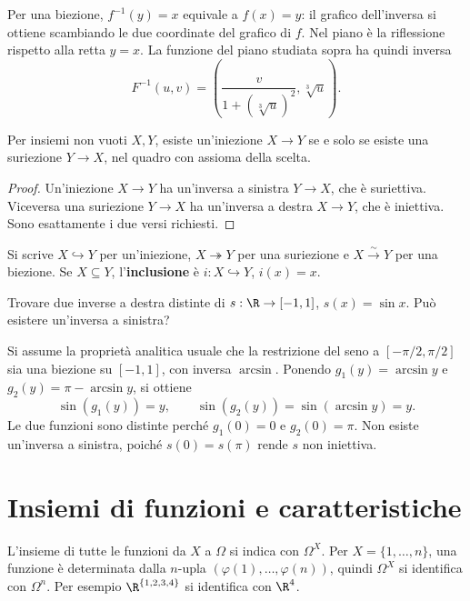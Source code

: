Per una biezione, $f^{-1}(y)=x$ equivale a $f(x)=y$: il grafico dell'inversa si ottiene scambiando le due coordinate del grafico di $f$. Nel piano è la riflessione rispetto alla retta $y=x$. La funzione del piano studiata sopra ha quindi inversa
\[
F^{-1}(u,v)=\left(\frac{v}{1+(\sqrt[3]u)^2},\sqrt[3]u\right).
\]

\begin{corollario}
Per insiemi non vuoti $X,Y$, esiste un'iniezione $X\to Y$ se e solo se esiste una suriezione $Y\to X$, nel quadro con assioma della scelta.
\end{corollario}
\begin{proof}
Un'iniezione $X\to Y$ ha un'inversa a sinistra $Y\to X$, che è suriettiva. Viceversa una suriezione $Y\to X$ ha un'inversa a destra $X\to Y$, che è iniettiva. Sono esattamente i due versi richiesti.
\end{proof}

Si scrive $X\hookrightarrow Y$ per un'iniezione, $X\twoheadrightarrow Y$ per una suriezione e $X\xrightarrow{\sim}Y$ per una biezione. Se $X\subseteq Y$, l'\textbf{inclusione} è $i:X\hookrightarrow Y$, $i(x)=x$.

\begin{esercizio}
Trovare due inverse a destra distinte di $s:\R\to[-1,1]$, $s(x)=\sin x$. Può esistere un'inversa a sinistra?
\end{esercizio}
\begin{svolgimento}
Si assume la proprietà analitica usuale che la restrizione del seno a $[-\pi/2,\pi/2]$ sia una biezione su $[-1,1]$, con inversa $\arcsin$. Ponendo $g_1(y)=\arcsin y$ e $g_2(y)=\pi-\arcsin y$, si ottiene
\[
\sin(g_1(y))=y,\qquad \sin(g_2(y))=\sin(\arcsin y)=y.
\]
Le due funzioni sono distinte perché $g_1(0)=0$ e $g_2(0)=\pi$. Non esiste un'inversa a sinistra, poiché $s(0)=s(\pi)$ rende $s$ non iniettiva.
\end{svolgimento}

\section{Insiemi di funzioni e caratteristiche}
\begin{definizione}
L'insieme di tutte le funzioni da $X$ a $\Omega$ si indica con $\Omega^X$. Per $X=\{1,\ldots,n\}$, una funzione è determinata dalla $n$-upla $(\varphi(1),\ldots,\varphi(n))$, quindi $\Omega^X$ si identifica con $\Omega^n$. Per esempio $\R^{\{1,2,3,4\}}$ si identifica con $\R^4$.
\end{definizione}

